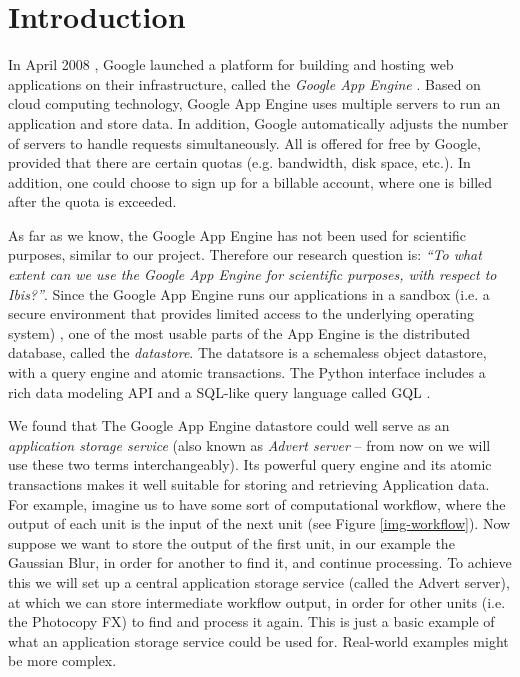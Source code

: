 \section{Introduction}
\label{introduction}
In April 2008 \cite{app-engine-intro}, Google launched a platform for building
and hosting web applications on their infrastructure, called the \emph{Google App
Engine} \cite{app-engine-www}. Based on cloud computing technology, Google App
Engine uses multiple servers to run an application and store data. In addition,
Google automatically adjusts the number of servers to handle requests
simultaneously. All is offered for free by Google, provided that there are
certain quotas (e.g. bandwidth, disk space, etc.). In addition, one could
choose to sign up for a billable account, where one is billed after the quota
is exceeded.

As far as we know, the Google App Engine has not been used for scientific
purposes, similar to our project. Therefore our research question is: \emph{``To
what extent can we use the Google App Engine for scientific purposes, with
respect to Ibis?''}. Since the Google App Engine runs our applications in a
sandbox (i.e. a secure environment that provides limited access to the underlying
operating system) \cite{app-engine-sandbox}, one of the most usable parts of the
App Engine is the distributed database, called the \emph{datastore}. The
datatsore is a schemaless object datastore, with a query engine and atomic
transactions. The Python interface includes a rich data modeling API and a
SQL-like query language called GQL \cite{app-engine-datastore}.

We found that The Google App Engine datastore could well serve as an
\emph{application storage service} (also known as \emph{Advert server} -- from
now on we will use these two terms interchangeably). Its powerful query engine
and its atomic transactions makes it well suitable for storing and retrieving
Application data. For example, imagine us to have some sort of computational
workflow, where the output of each unit is the input of the next unit (see Figure
\ref{img-workflow}). Now suppose we want to store the output of the first unit,
in our example the Gaussian Blur, in order for another to find it, and continue
processing. To achieve this we will set up a central application storage service
(called the Advert server), at which we can store intermediate workflow output,
in order for other units (i.e. the Photocopy FX) to find and process it again.
This is just a basic example of what an application storage service could be used
for. Real-world examples might be more complex.

